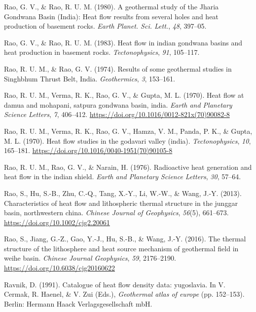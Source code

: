 \documentclass[draft,linenumbers]{agujournal2018}
\begin{document}
\leavevmode{}%
Rao, G. V., \& Rao, R. U. M. (1980). A geothermal study of the {Jharia
Gondwana Basin (India)}: Heat flow results from several holes and heat
production of basement rocks. \emph{Earth Planet. Sci. Lett.},
\emph{48}, 397--05.

\leavevmode{}%
Rao, G. V., \& Rao, R. U. M. (1983). Heat flow in indian gondwana basins
and heat production in basement rocks. \emph{Tectonophysics}, \emph{91},
105--117.

\leavevmode{}%
Rao, R. U. M., \& Rao, G. V. (1974). Results of some geothermal studies
in {Singhbhum Thrust Belt, India}. \emph{Geothermics}, \emph{3},
153--161.

\leavevmode{}%
Rao, R. U. M., Verma, R. K., Rao, G. V., \& Gupta, M. L. (1970). Heat
flow at damua and mohapani, satpura gondwana basin, india. \emph{Earth
and Planetary Science Letters}, \emph{7}, 406--412.
\url{https://doi.org/10.1016/0012-821x(70)90082-8}

\leavevmode{}%
Rao, R. U. M., Verma, R. K., Rao, G. V., Hamza, V. M., Panda, P. K., \&
Gupta, M. L. (1970). Heat flow studies in the godavari valley (india).
\emph{Tectonophysics}, \emph{10}, 165--181.
\url{https://doi.org/10.1016/0040-1951(70)90105-8}

\leavevmode{}%
Rao, R. U. M., Rao, G. V., \& Narain, H. (1976). Radioactive heat
generation and heat flow in the indian shield. \emph{Earth and Planetary
Science Letters}, \emph{30}, 57--64.

\leavevmode{}%
Rao, S., Hu, S.-B., Zhu, C.-Q., Tang, X.-Y., Li, W.-W., \& Wang, J.-Y.
(2013). Characteristics of heat flow and lithospheric thermal structure
in the junggar basin, northwestern china. \emph{Chinese Journal of
Geophysics}, \emph{56}(5), 661--673.
\url{https://doi.org/10.1002/cjg2.20061}

\leavevmode{}%
Rao, S., Jiang, G.-Z., Gao, Y.-J., Hu, S.-B., \& Wang, J.-Y. (2016). The
thermal structure of the lithosphere and heat source mechanism of
geothermal field in weihe basin. \emph{Chinese Journal Geophysics},
\emph{59}, 2176--2190. \url{https://doi.org/10.6038/cjg20160622}

\leavevmode{}%
Ravnik, D. (1991). Catalogue of heat flow density data: yugoslavia. In
V. Cermak, R. Haenel, \& V. Zui (Eds.), \emph{Geothermal atlas of
europe} (pp. 152--153). Berlin: Hermann Haack Verlagsgesellschaft mbH.
\end{document}
